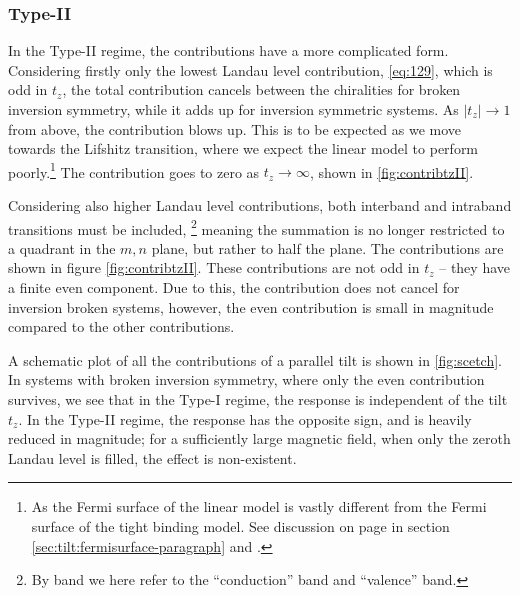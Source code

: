 \subsubsection{Type-II}
In the Type-II regime, the contributions have a more complicated form.
Considering firstly only the lowest Landau level contribution, \cref{eq:129}, which is odd in \( t_z \), the total contribution cancels between the chiralities for broken inversion symmetry, while it adds up for inversion symmetric systems.
As \( |t_z| \to 1 \) from above, the contribution blows up.
This is to be expected as we move towards the Lifshitz transition, where we expect the linear model to perform poorly.\footnote{As the Fermi surface of the linear model is vastly different from the Fermi surface of the tight binding model.
See discussion on page \pageref{sec:tilt:fermisurface-paragraph} in section \ref{sec:tilt:fermisurface-paragraph} and  \textcite{vanderwurffMagnetovorticalThermoelectricTransport2019}.}
The contribution goes to zero as \( t_z \to \infty \), shown in \cref{fig:contribtzII}.

Considering also higher Landau level contributions, both interband and intraband transitions must be included,%
\footnote{By band we here refer to the ``conduction'' band and ``valence'' band.}
meaning the summation is no longer restricted to a quadrant in the \( m,n \) plane, but rather to half the plane.
The contributions are shown in figure \ref{fig:contribtzII}.
These contributions are not odd in \( t_z \) -- they have a finite even component.
Due to this, the contribution does not cancel for inversion broken systems, however, the even contribution is small in magnitude compared to the other contributions.

A schematic plot of all the contributions of a parallel tilt is shown in \cref{fig:scetch}.
In systems with broken inversion symmetry, where only the even contribution survives, we see that in the Type-I regime, the response is independent of the tilt \( t_z \).
In the Type-II regime, the response has the opposite sign, and is heavily reduced in magnitude;
for a sufficiently large magnetic field, when only the zeroth Landau level is filled, the effect is non-existent.

